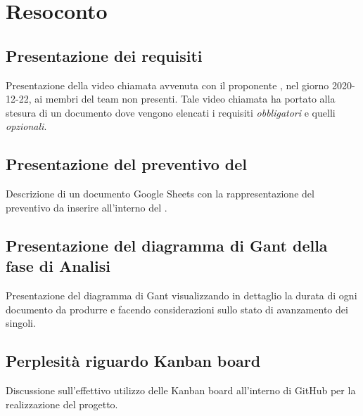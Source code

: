 \section{Resoconto}

\subsection{Presentazione dei requisiti}
Presentazione della video chiamata avvenuta con il proponente \Proponente{}, nel giorno 2020-12-22, ai membri del team non presenti. Tale video chiamata ha portato alla stesura di un documento dove vengono elencati i requisiti \textit{obbligatori} e quelli \textit{opzionali}.

\subsection{Presentazione del preventivo del \PdP}
Descrizione di un documento Google Sheets con la rappresentazione del preventivo da inserire all'interno del \PdP.

\subsection{Presentazione del diagramma di Gant della fase di Analisi}
Presentazione del diagramma di Gant visualizzando in dettaglio la durata di ogni documento da produrre e facendo considerazioni sullo stato di avanzamento dei singoli.

\subsection{Perplesità riguardo Kanban board}
Discussione sull'effettivo utilizzo delle Kanban board all'interno di GitHub per la realizzazione del progetto.